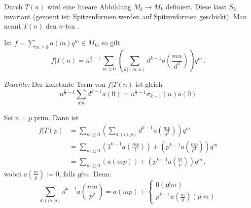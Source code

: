 \begin{satz-list}
	\item Durch $T(n)$ wird eine lineare Abbildung $M_k \to M_k$ definiert. Diese lässt $S_k$ invariant (gemeint ist: Spitzenformen werden auf Spitzenformen geschickt). Man nennt $T(n)$ den $n$-ten .
	\item Ist $f = \sum_{m \geq 0} a(m) q^m \in M_k$, so gilt
	\[
	f | T(n) = n^{\frac k2 - 1} \sum_{m \geq 0} \left( \sum_{d | (m,n)} d^{k-1} a\left(\frac{mn}{d^2}\right) \right) q^m
	\,.
	\]
\end{satz-list}

\emph{Beachte:} Der konstante Term von $f | T(n)$ ist gleich
\[
n^{\frac k2 - 1} \sum_{d|n} d^{k-1} a(0) = n^{\frac k2 - 1} \sigma_{k-1}(n) a(0)
\]

\begin{bsp}
Sei $n = p$ prim. Dann ist
\begin{align*}
f | T(p) &= \sum_{m \geq 0} \left( \sum_{d | (m,p)} d^{k-1} a\left(\frac{mp}{d^2}\right) \right) q^m\\
&= \sum_{m \geq 0} \left( 1^{k-1} a\left(\frac{mp}{1}\right) \right) + \left( p^{k-1} a\left(\frac{mp}{p^2}\right) \right) q^m \\
&= \sum_{m \geq 0} \left( a\left(mp\right) \right) + \left( p^{k-1} a\left(\frac{m}{p}\right) \right) q^m
\,,
\end{align*}
wobei $a\left(\frac mp\right) := 0$, falls $p \not | m$. Denn:
\[
\sum_{d | (m,p)} d^{k-1} a \left( \frac {mn}{p^2} \right) = a \left(mp\right) + \begin{cases} 0 (p \not | m) \\ p^{k-1} a \left(\frac mp \right) (p | m) \end{cases}
\]
\end{bsp}

